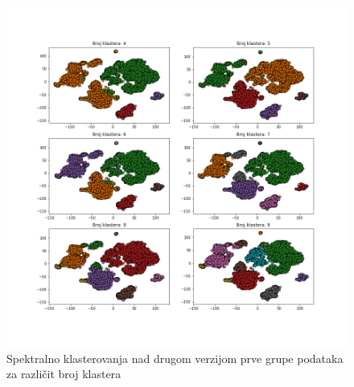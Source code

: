 \documentclass[a4paper]{article}
\begin{document}
\begin{figure}[h!]
\centering
\includegraphics[scale=0.4]{hvg_nmf_spectral}
\caption{Spektralno klasterovanja nad drugom verzijom prve grupe podataka za različit broj klastera}
\label{hvg_nmf_spectral}
\end{figure}



\newpage


\end{document}
